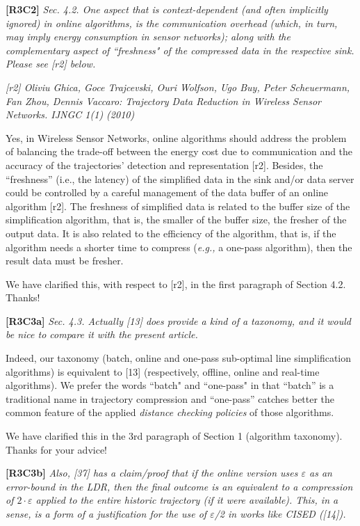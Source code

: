 \documentclass{letter}
\newcommand{\eg}{\emph{e.g.,}\xspace}
\begin{document}
\textbf{[R3C2]} \emph{
Sec. 4.2. One aspect that is context-dependent (and often implicitly ignored) in online algorithms, is the communication overhead (which, in turn, may imply energy consumption in sensor networks); along with the complementary aspect of ``freshness" of the compressed data in the respective sink. Please see [r2] below.}

\emph{[r2] Oliviu Ghica, Goce Trajcevski, Ouri Wolfson, Ugo Buy, Peter Scheuermann, Fan Zhou, Dennis Vaccaro: Trajectory Data Reduction in Wireless Sensor Networks. IJNGC 1(1) (2010)
}

{Yes, in Wireless Sensor Networks, online algorithms should address the problem of balancing the trade-off between the energy cost due to communication and the accuracy of the trajectories' detection and representation [r2].} Besides, the ``freshness'' (i.e., the latency) of the simplified data in the sink and/or data server could be controlled by a careful management of the data buffer of an online algorithm [r2]. The freshness of simplified data is related to the buffer size of the simplification algorithm, that is, the smaller of the buffer size, the fresher of the output data. It is also related to the efficiency of the algorithm, that is, if the algorithm needs a shorter time to compress (\eg a one-pass algorithm), then the result data must be fresher.

We have clarified this, with respect to [r2], in the first paragraph of Section 4.2.
Thanks!

\textbf{[R3C3a]} \emph{
Sec. 4.3. Actually [13] does provide a kind of a taxonomy, and it would be nice to compare it with the present article. }

Indeed, our taxonomy (batch, online and one-pass sub-optimal line simplification algorithms) is equivalent to [13] (respectively, offline, online and real-time algorithms).
We prefer the words ``batch" and ``one-pass" in that ``batch'' is a traditional name in trajectory compression and ``one-pass'' catches  better the common feature of the applied \emph{distance checking policies} of those algorithms.

We have clarified this in the 3rd paragraph of Section 1 (algorithm taxonomy).
Thanks for your advice!

\textbf{[R3C3b]} \emph{Also, [37] has a claim/proof that if the online version uses $\varepsilon$ as an error-bound in the LDR, then the final outcome is an equivalent to a compression of $2 \cdot \varepsilon$ applied to the entire historic trajectory (if it were available). This, in a sense, is a form of a justification for the use of $\varepsilon$/2 in works like CISED ([14]).}
\end{document}
